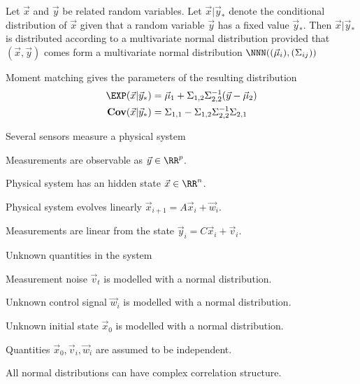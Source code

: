 \documentclass[landscape,footrule]{foils}
\newcommand{\COV}{\mathbf{Cov}}
\begin{document}
Let $\vec{x}$ and $\vec{y}$ be related random variables. 
Let $\vec{x}|\vec{y}_*$ denote the conditional distribution of $\vec{x}$ given that a random variable $\vec{y}$ has a fixed value $\vec{y}_*$.
Then $\vec{x}|\vec{y}_*$ is distributed according to a multivariate normal distribution provided that 
 $(\vec{x},\vec{y})$ comes form a multivariate normal distribution $\NNN((\vec{\mu}_i),(\Sigma_{ij}))$

\begin{triangles}
\item Moment matching gives the parameters of the resulting distribution 
\begin{align*}
\EXP(\vec{x}|\vec{y}_*)&= \vec{\mu}_1+ \Sigma_{1,2}\Sigma_{2,2}^{-1}(\vec{y}-\vec{\mu}_2)\\
\COV(\vec{x}|\vec{y}_*)&= \Sigma_{1,1}-\Sigma_{1,2}\Sigma_{2,2}^{-1}\Sigma_{2,1}\\
\end{align*}
\end{triangles}





Several sensors measure a physical system
\begin{triangles}
\item Measurements are observable as $\vec{y}\in\RR^p$.
\item Physical system has an hidden state $\vec{x}\in\RR^n$.
\item Physical system evolves linearly $\vec{x}_{i+1}=A\vec{x}_i+\vec{w}_i$.
\item Measurements are linear from the state $\vec{y}_{i}=C\vec{x}_i+\vec{v}_i$.
\end{triangles}
\vspace*{1cm}

Unknown quantities in the system
\begin{triangles}
\item Measurement noise $\vec{v}_t$ is modelled with a normal distribution.
\item Unknown control signal $\vec{w}_i$ is modelled with a normal distribution.
\item Unknown initial state $\vec{x}_0$ is modelled with a normal distribution.
\item Quantities $\vec{x}_0, \vec{v}_i, \vec{w}_i$ are assumed to be independent.
\item All normal distributions can have complex correlation structure.
\end{triangles}
\end{document}
